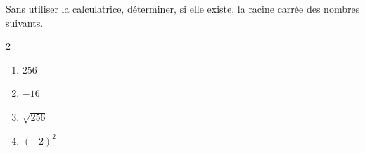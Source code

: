 \begin{exo}{}
	Sans utiliser la calculatrice, déterminer, si elle existe, la racine carrée des nombres suivants.
	\vspace*{-2mm}\begin{multicols}{2}
		\begin{enumerate}[itemsep=2mm]
			\item $256$
			\item $-16$
			\item $\sqrt{256}$
			\item $(-2)^2$
		\end{enumerate}
	\end{multicols}\vspace*{-2mm}
\end{exo}
